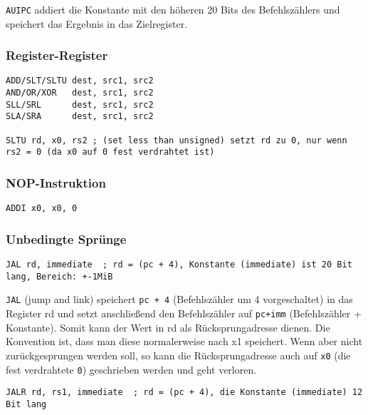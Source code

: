 \lstinline[style=risc-v_Assembler]!AUIPC! addiert die Konstante mit den höheren 20 Bits des Befehlszählers und speichert das Ergebnis in das Zielregister.

\subsubsection{Register-Register}

\begin{lstlisting}[style=risc-v_Assembler]
ADD/SLT/SLTU dest, src1, src2
AND/OR/XOR   dest, src1, src2
SLL/SRL      dest, src1, src2
SLA/SRA      dest, src1, src2

SLTU rd, x0, rs2 ; (set less than unsigned) setzt rd zu 0, nur wenn rs2 = 0 (da x0 auf 0 fest verdrahtet ist)
\end{lstlisting}

\subsubsection{NOP-Instruktion}

\begin{lstlisting}[style=risc-v_Assembler]
ADDI x0, x0, 0
\end{lstlisting}

\subsubsection{Unbedingte Sprünge}

\begin{lstlisting}[style=risc-v_Assembler]
JAL rd, immediate  ; rd = (pc + 4), Konstante (immediate) ist 20 Bit lang, Bereich: +-1MiB
\end{lstlisting}

\lstinline[style=risc-v_Assembler]!JAL! (jump and link) speichert \lstinline[style=risc-v_Assembler]!pc + 4! (Befehlszähler um 4 vorgeschaltet) in das Register rd und setzt anschließend den Befehlszähler auf \lstinline[style=risc-v_Assembler]!pc+imm! (Befehlszähler + Konstante). Somit kann der Wert in rd als Rücksprungadresse dienen. Die Konvention ist, dass man diese normalerweise nach x1 speichert. Wenn aber nicht zurückgesprungen werden soll, so kann die Rücksprungadresse auch auf \lstinline[style=risc-v_Assembler]!x0! (die fest verdrahtete \lstinline[style=risc-v_Assembler]!0!) geschrieben werden und geht verloren.

\begin{lstlisting}[style=risc-v_Assembler]
JALR rd, rs1, immediate  ; rd = (pc + 4), die Konstante (immediate) 12 Bit lang
\end{lstlisting}

